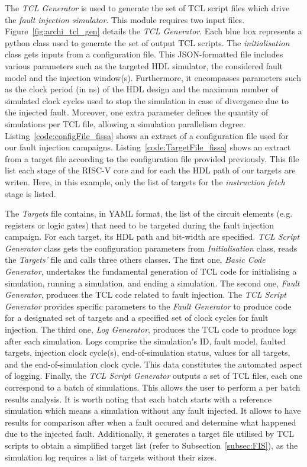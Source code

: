 The \textit{TCL Generator} is used to generate the set of TCL script files which drive the \textit{fault injection simulator}. This module requires two input files.
Figure~\ref{fig:archi_tcl_gen} details the \textit{TCL Generator}. Each blue box represents a python class used to generate the set of output TCL scripts.
The \textit{initialisation} class gets inputs from a configuration file. This JSON-formatted file includes various parameters such as the targeted HDL simulator, the considered fault model and the injection window(s). Furthermore, it encompasses parameters such as the clock period (in ns) of the HDL design and the maximum number of simulated clock cycles used to stop the simulation in case of divergence due to the injected fault. Moreover, one extra parameter defines the quantity of simulations per TCL file, allowing a simulation parallelism degree.
Listing~\ref{code:configFile_fissa} shows an extract of a configuration file used for our fault injection campaigns.
Listing~\ref{code:TargetFile_fissa} shows an extract from a target file according to the configuration file provided previously. This file list each stage of the RISC-V core and for each the HDL path of our targets are writen. Here, in this example, only the list of targets for the \textit{instruction fetch} stage is listed.

The \textit{Targets} file contains, in YAML format, the list of the circuit elements (e.g. registers or logic gates) that need to be targeted during the fault injection campaign. For each target, its HDL path and bit-width are specified.
\textit{TCL Script Generator} class gets the configuration parameters from \textit{Initialisation} class, reads the \textit{Targets'} file and calls three others classes.
The first one, \textit{Basic Code Generator}, undertakes the fundamental generation of TCL code for initialising a simulation, running a simulation, and ending a simulation.
The second one, \textit{Fault Generator}, produces the TCL code related to fault injection. The \textit{TCL Script Generator} provides specific parameters to the \textit{Fault Generator} to produce code for a designated set of targets and a specified set of clock cycles for fault injection.
The third one, \textit{Log Generator}, produces the TCL code to produce logs after each simulation.
Logs comprise the simulation's ID, fault model, faulted targets, injection clock cycle(s), end-of-simulation status, values for all targets, and the end-of-simulation clock cycle. This data constitutes the automated aspect of logging.
Finally, the \textit{TCL Script Generator} outputs a set of TCL files, each one correspond to a batch of simulations. This allows the user to perform a per batch results analysis. It is worth noting that each batch starts with a reference simulation which means a simulation without any fault injected. It allows to have results for comparison after when a fault occured and determine what happened due to the injected fault.
Additionally, it generates a target file utilised by TCL scripts to obtain a simplified target list (refer to Subsection~\ref{subsec:FIS}), as the simulation log requires a list of targets without their sizes.

